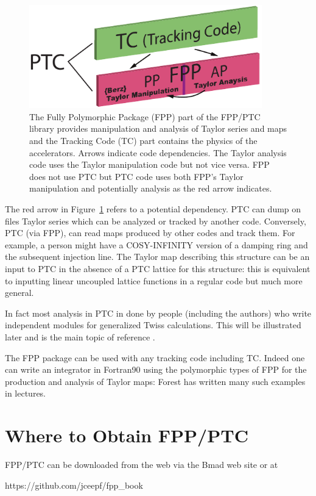 \documentclass{hitec}     %
\newcommand{\Section}[1]{\section{#1}\vspace*{-1ex}}
\begin{document}
\begin{figure}[tb]
  \centering
  \includegraphics[width=0.9\textwidth]{ptcfppe.pdf}
  \caption{
The Fully Polymorphic Package (FPP) part of the FPP/PTC library provides manipulation and analysis
of Taylor series and maps and the Tracking Code (TC) part contains the physics of 
 the  accelerators. Arrows indicate code dependencies. The Taylor analysis code uses
the Taylor manipulation code but not vice versa. FPP does not use PTC but PTC code uses both FPP's
Taylor manipulation and potentially analysis as the red arrow indicates.
  }
  \label{f:ptc}
\end{figure}

The red arrow in Figure~\ref{f:ptc} refers to a potential dependency. PTC can dump on files Taylor series which can be analyzed or tracked by another code. Conversely, PTC (via FPP), can read maps produced by other codes and track them. For example, a person might have a COSY-INFINITY version of a damping ring and the subsequent injection line. The Taylor map describing this structure can be an input to PTC in the absence of a PTC lattice for this structure: this is equivalent to inputting linear uncoupled lattice functions in a regular code but much more general.


In fact most analysis in PTC in done by people (including the authors) who write independent modules for generalized Twiss calculations. This will be illustrated later and is the main topic of reference \cite{thenewbook}.


The FPP package can be used with any  tracking code including TC. Indeed one can  write an integrator in Fortran90 using the polymorphic types of FPP for the production and analysis of Taylor maps: Forest has written many such examples in lectures.


\Section{Where to Obtain FPP/PTC}
\label{s:obtain}

FPP/PTC can be downloaded from the web via the Bmad web site\cite{b:Bmad} or at
\begin{code}
https://github.com/jceepf/fpp_book
\end{code}
\end{document}
